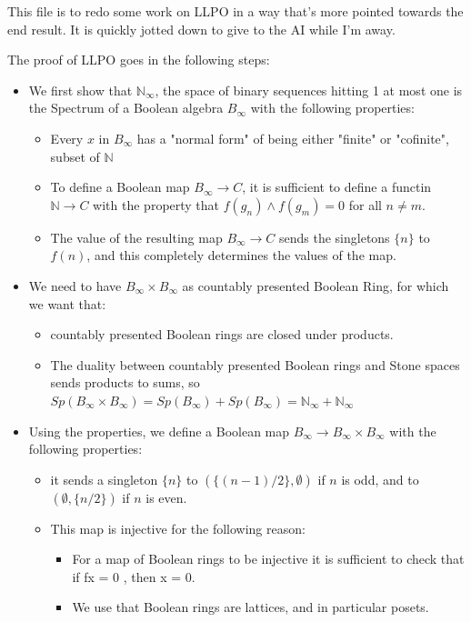 This file is to redo some work on LLPO in a way that's more pointed towards the end result. It is quickly jotted down to give to the AI while I'm away. 

The proof of LLPO goes in the following steps: 
\begin{itemize}
  \item We first show that $\mathbb N_\infty$, the space of binary sequences hitting 1 at most one is the Spectrum of a Boolean algebra $B_\infty$ with the following properties:
    \begin{itemize}
      \item Every $x$ in $B_\infty$ has a "normal form" of being either "finite" or "cofinite", subset of $\mathbb N$
      \item To define a Boolean map $B_\infty \to C$, it is sufficient to define a functin $\mathbb N \to C$ with the property that $f(g_n) \wedge f(g_m) = 0$ for all $n \neq m$. 
      \item The value of the resulting map $B_\infty \to C$ sends the singletons $\{n\}$ to $f(n)$, and this completely determines the values of the map. 
    \end{itemize}
  \item We need to have $B_\infty \times B_\infty$ as countably presented Boolean Ring, for which we want that: 
    \begin{itemize}
      \item countably presented Boolean rings are closed under products. 
      \item The duality between countably presented Boolean rings and Stone spaces sends products to sums, so 
        $Sp (B_\infty \times B_\infty) = Sp (B_\infty) + Sp (B_\infty)= \mathbb N_\infty + \mathbb N_\infty$
    \end{itemize}
  \item Using the properties, we define a Boolean map $B_\infty \to B_\infty \times B_\infty$ with the following properties: 
    \begin{itemize} 
      \item it sends a singleton $\{n\}$ to $(\{(n-1)/2\},\emptyset)$ if $n$ is odd, and to $(\emptyset, \{n/2\})$ if $n$ is even.
      \item This map is injective for the following reason: 
        \begin{itemize}
          \item For a map of Boolean rings to be injective it is sufficient to check that if fx = 0 , then x = 0. 
          \item We use that Boolean rings are lattices, and in particular posets. 

\end{itemize}
\end{itemize}
\end{itemize}
